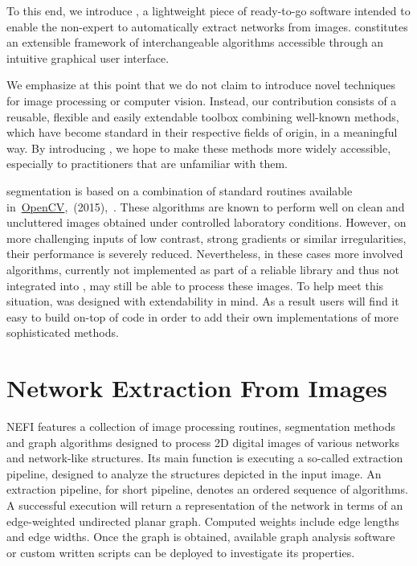 	To this end, we introduce \NEFI, a lightweight piece of ready-to-go software intended to enable the non-expert to automatically extract networks from images. \NEFI constitutes an extensible framework of interchangeable algorithms accessible through an intuitive graphical user interface. 

	We emphasize at this point that we do not claim to introduce novel techniques for image processing or computer vision. Instead, our contribution consists of a reusable, flexible and easily extendable toolbox combining well-known methods, which have become standard in their respective fields of origin, in a meaningful way. By introducing \NEFI, we hope to make these methods more widely accessible, especially to practitioners that are unfamiliar with them.

	\NEFIs segmentation is based on a combination of standard routines available in~\href{http://opencv.org/}{OpenCV},~(2015),~\cite{opencv}. These algorithms are known to perform well on clean and uncluttered images obtained under controlled laboratory conditions. However, on more challenging inputs of low contrast, strong gradients or similar irregularities, their performance is severely reduced. Nevertheless, in these cases more involved algorithms, currently not implemented as part of a reliable library and thus not integrated into \NEFI, may still be able to process these images. To help meet this situation, \NEFI was designed with extendability in mind. As a result users will find it easy to build on-top of \NEFIs code in order to add their own implementations of more sophisticated methods. 

\section{Network Extraction From Images}	%

	NEFI features a collection of image processing routines, segmentation methods and graph algorithms designed to process 2D digital images of various networks and network-like structures. Its main function is executing a so-called extraction pipeline, designed to analyze the structures depicted in the input image. An extraction pipeline, for short pipeline, denotes an ordered sequence of algorithms. A successful execution will return a representation of the network in terms of an edge-weighted undirected planar graph. Computed weights include edge lengths and edge widths. Once the graph is obtained, available graph analysis software~\cite{ICWSM09154,snap,batagelj1998pajek,5437689,loscalzo2008social,hagberg2008exploring} or custom written scripts can be deployed to investigate its properties.

